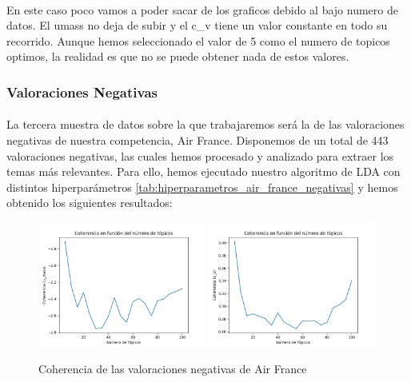 \documentclass{report}
\begin{document}
{                    \paragraph*{}
                    {
                        En este caso poco vamos a poder sacar de los graficos debido al bajo numero de datos.
                        El umass no deja de subir y el c\_v tiene un valor constante en todo su recorrido.
                        Aunque hemos seleccionado el valor de 5 como el numero de topicos optimos, la realidad es que no se puede obtener nada de estos valores.
                    }
                \clearpage\subsubsection*{Valoraciones Negativas}
                    \paragraph*{}{
                        La tercera muestra de datos sobre la que trabajaremos será la de las valoraciones negativas de nuestra competencia, Air France.
                        Disponemos de un total de 443 valoraciones negativas, las cuales hemos procesado y analizado para extraer los temas más relevantes.
                        Para ello, hemos ejecutado nuestro algoritmo de LDA con distintos hiperparámetros \ref{tab:hiperparametros_air_france_negativas} y hemos obtenido los siguientes resultados:
                    }
                    \begin{figure}[H]
                        \centering
                        \includegraphics[width=0.49\textwidth]{./img/air_france_negativas_umass.png}
                        \includegraphics[width=0.49\textwidth]{./img/air_france_negativas_cv.png}
                        \caption{Coherencia de las valoraciones negativas de Air France}
                    \end{figure}
}
\end{document}
